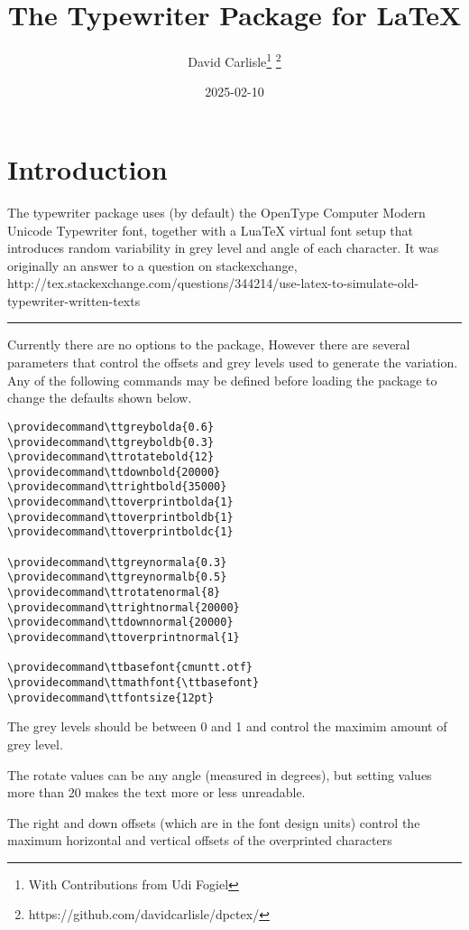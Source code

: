 \documentclass{article}
\providecommand\ttbasefont{QTAntiquePost.otf}
\providecommand\ttmathfont{cmuntt.otf}
\providecommand\ttoverprintnormal{0}
\providecommand\ttoverprintbolda{1}
\providecommand\ttoverprintboldb{0}
\providecommand\ttoverprintboldc{0}
\providecommand\ttgreynormala{0.5}
\providecommand\ttrotatenormal{3}
\begin{document}
\title{The Typewriter Package for LaTeX}
\author{David Carlisle\thanks{With Contributions from Udi Fogiel}
        \thanks{https://github.com/davidcarlisle/dpctex/}}
\date{2025-02-10}

\maketitle

\section{Introduction}
The typewriter package uses (by default) the OpenType Computer Modern Unicode
Typewriter font, together with a LuaTeX virtual font setup that
introduces random variability in grey level and angle of each
character. It was originally an answer to a question on stackexchange,
http://tex.stackexchange.com/questions/344214/use-latex-to-simulate-old-typewriter-written-texts


\hrule

Currently there are no options to the package, However there are several parameters that control the offsets
and grey levels used to generate the variation. Any of the following
commands may be defined before loading the package to change the defaults shown below.

\begin{verbatim}
\providecommand\ttgreybolda{0.6}
\providecommand\ttgreyboldb{0.3}
\providecommand\ttrotatebold{12}
\providecommand\ttdownbold{20000}
\providecommand\ttrightbold{35000}
\providecommand\ttoverprintbolda{1}
\providecommand\ttoverprintboldb{1}
\providecommand\ttoverprintboldc{1}

\providecommand\ttgreynormala{0.3}
\providecommand\ttgreynormalb{0.5}
\providecommand\ttrotatenormal{8}
\providecommand\ttrightnormal{20000}
\providecommand\ttdownnormal{20000}
\providecommand\ttoverprintnormal{1}

\providecommand\ttbasefont{cmuntt.otf}
\providecommand\ttmathfont{\ttbasefont}
\providecommand\ttfontsize{12pt}
\end{verbatim}

The grey levels should be between 0 and 1 and control the maximim
amount of grey level.

The rotate values can be any angle (measured in degrees), but setting
values more than 20 makes the text more or less unreadable.

The right and down offsets (which are in the font design units) control the
maximum horizontal and vertical offsets of the overprinted characters
\end{document}
